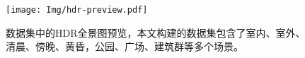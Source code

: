 \begin{figure}[!htbp]
  \centering
  \texttt{[image: Img/hdr-preview.pdf]}
  \caption{
    \label{fig:hdr-preview}
    数据集中的HDR全景图预览，本文构建的数据集包含了室内、室外、清晨、傍晚、黄昏，公园、广场、建筑群等多个场景。
  }
\end{figure}